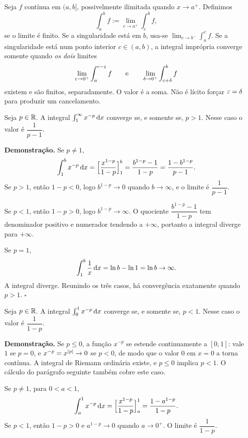 \documentclass[11pt,a4paper]{article}
\begin{document}
\begin{definicao}[Tipo II]
Seja \(f\) contínua em \((a,b]\), possivelmente ilimitada quando \(x\to a^{+}\). Definimos
\[
\int_a^{b} f
:=\lim_{c\to a^{+}}\int_c^{b} f,
\]
se o limite é finito. Se a singularidade está em \(b\), usa-se \(\lim_{c\to b^{-}}\int_a^{c} f\). Se a singularidade está num ponto interior \(c\in(a,b)\), a integral imprópria converge somente quando \emph{os dois} limites
\[
\lim_{\varepsilon\to 0^{+}}\int_a^{c-\varepsilon} f
\qquad\text{e}\qquad
\lim_{\delta\to 0^{+}}\int_{c+\delta}^{b} f
\]
existem e são finitos, separadamente. O valor é a soma. Não é lícito forçar \(\varepsilon=\delta\) para produzir um cancelamento.
\end{definicao}

\begin{teorema}
Seja \(p\in\mathbb{R}\). A integral \(\int_1^{\infty} x^{-p}\,\mathrm{d} x\) converge se, e somente se, \(p>1\). Nesse caso o valor é \(\dfrac{1}{p-1}\).
\end{teorema}

\noindent\textbf{Demonstração.}
Se \(p\neq 1\),
\[
\int_1^{b} x^{-p}\,\mathrm{d} x
=\Bigl[\frac{x^{1-p}}{1-p}\Bigr]_1^{b}
=\frac{b^{1-p}-1}{1-p}
=\frac{1-b^{1-p}}{p-1}.
\]
Se \(p>1\), então \(1-p<0\), logo \(b^{1-p}\to 0\) quando \(b\to\infty\), e o limite é \(\dfrac{1}{p-1}\).

Se \(p<1\), então \(1-p>0\), logo \(b^{1-p}\to\infty\). O quociente \(\dfrac{b^{1-p}-1}{1-p}\) tem denominador positivo e numerador tendendo a \(+\infty\), portanto a integral diverge para \(+\infty\).

Se \(p=1\),
\[
\int_1^{b}\frac{1}{x}\,\mathrm{d} x=\ln b-\ln 1=\ln b\to\infty.
\]
A integral diverge. Reunindo os três casos, há convergência exatamente quando \(p>1\).
\hfill\(\square\)

\begin{teorema}
Seja \(p\in\mathbb{R}\). A integral \(\int_0^{1} x^{-p}\,\mathrm{d} x\) converge se, e somente se, \(p<1\). Nesse caso o valor é \(\dfrac{1}{1-p}\).
\end{teorema}

\noindent\textbf{Demonstração.}
Se \(p\le 0\), a função \(x^{-p}\) se estende continuamente a \([0,1]\): vale \(1\) se \(p=0\), e \(x^{-p}=x^{\left\lvert p \right\rvert}\to 0\) se \(p<0\), de modo que o valor \(0\) em \(x=0\) a torna contínua. A integral de Riemann ordinária existe, e \(p\le 0\) implica \(p<1\). O cálculo do parágrafo seguinte também cobre este caso.

Se \(p\neq 1\), para \(0<a<1\),
\[
\int_a^{1} x^{-p}\,\mathrm{d} x
=\Bigl[\frac{x^{1-p}}{1-p}\Bigr]_a^{1}
=\frac{1-a^{1-p}}{1-p}.
\]
Se \(p<1\), então \(1-p>0\) e \(a^{1-p}\to 0\) quando \(a\to 0^{+}\). O limite é \(\dfrac{1}{1-p}\).
\end{document}
